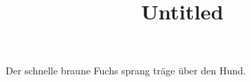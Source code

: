 \documentclass[12pt]{article}
\begin{document}
    \title{Untitled}
    Der schnelle braune Fuchs sprang träge über den Hund.
\end{document}
